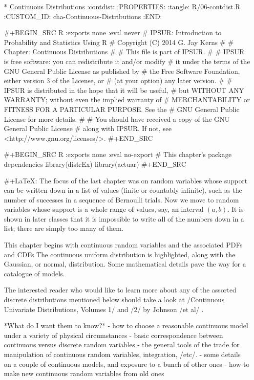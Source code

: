 * Continuous Distributions                                         :contdist:
:PROPERTIES:
:tangle: R/06-contdist.R
:CUSTOM_ID: cha-Continuous-Distributions
:END:

#+BEGIN_SRC R :exports none :eval never
#    IPSUR: Introduction to Probability and Statistics Using R
#    Copyright (C) 2014  G. Jay Kerns
#
#    Chapter: Continuous Distributions
#
#    This file is part of IPSUR.
#
#    IPSUR is free software: you can redistribute it and/or modify
#    it under the terms of the GNU General Public License as published by
#    the Free Software Foundation, either version 3 of the License, or
#    (at your option) any later version.
#
#    IPSUR is distributed in the hope that it will be useful,
#    but WITHOUT ANY WARRANTY; without even the implied warranty of
#    MERCHANTABILITY or FITNESS FOR A PARTICULAR PURPOSE.  See the
#    GNU General Public License for more details.
#
#    You should have received a copy of the GNU General Public License
#    along with IPSUR.  If not, see <http://www.gnu.org/licenses/>.
#+END_SRC

#+BEGIN_SRC R :exports none :eval no-export
# This chapter's package dependencies
library(distrEx)
library(actuar)
#+END_SRC

#+LaTeX: \noindent 
The focus of the last chapter was on random variables whose support
can be written down in a list of values (finite or countably
infinite), such as the number of successes in a sequence of Bernoulli
trials. Now we move to random variables whose support is a whole range
of values, say, an interval \((a,b)\). It is shown in later classes
that it is impossible to write all of the numbers down in a list;
there are simply too many of them.

This chapter begins with continuous random variables and the
associated PDFs and CDFs The continuous uniform distribution is
highlighted, along with the Gaussian, or normal, distribution. Some
mathematical details pave the way for a catalogue of models.

The interested reader who would like to learn more about any of the
assorted discrete distributions mentioned below should take a look at
/Continuous Univariate Distributions, Volumes 1/ and /2/ by Johnson
/et al/ \cite{Johnson1994,Johnson1995}.

*What do I want them to know?*
- how to choose a reasonable continuous model under a variety of
  physical circumstances
- basic correspondence between continuous versus discrete random
  variables
- the general tools of the trade for manipulation of continuous random
  variables, integration, /etc/.
- some details on a couple of continuous models, and exposure to a
  bunch of other ones
- how to make new continuous random variables from old ones

